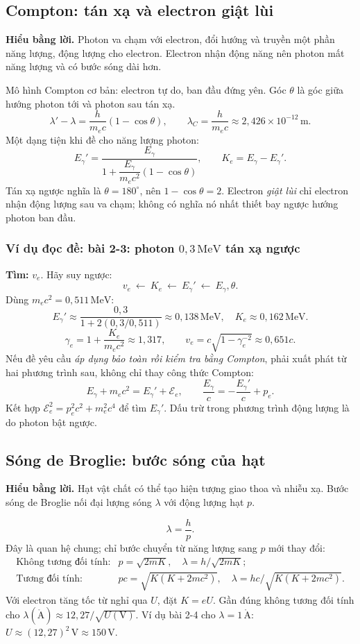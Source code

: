 \documentclass[11pt,a4paper]{article}
\newcommand{\unit}[1]{\,\mathrm{#1}}
\newcommand{\idea}[1]{\par\textbf{Hiểu bằng lời.} #1\par}
\newcommand{\ex}[1]{\subsubsection*{Ví dụ đọc đề: #1}}
\begin{document}
\subsection{Compton: tán xạ và electron giật lùi}\label{sec:compton}
\idea{Photon va chạm với electron, đổi hướng và truyền một phần năng lượng,
động lượng cho electron. Electron nhận động năng nên photon mất năng lượng
và có bước sóng dài hơn.}
Mô hình Compton cơ bản: electron tự do, ban đầu đứng yên.
Góc $\theta$ là góc giữa hướng photon tới và photon sau tán xạ.
\[
\lambda'-\lambda=\frac{h}{m_ec}(1-\cos\theta),\qquad
\lambda_C=\frac h{m_ec}\approx2{,}426\times10^{-12}\unit m.
\]
Một dạng tiện khi đề cho năng lượng photon:
\[
E_\gamma'=\frac{E_\gamma}{1+\dfrac{E_\gamma}{m_ec^2}(1-\cos\theta)},
\qquad K_e=E_\gamma-E_\gamma'.
\]
Tán xạ ngược nghĩa là $\theta=180^\circ$, nên $1-\cos\theta=2$.
Electron \emph{giật lùi} chỉ electron nhận động lượng sau va chạm;
không có nghĩa nó nhất thiết bay ngược hướng photon ban đầu.

\ex{bài 2-3: photon $0{,}3\unit{MeV}$ tán xạ ngược}
\textbf{Tìm:} $v_e$. Hãy suy ngược:
\[
v_e\ \longleftarrow\ K_e\ \longleftarrow\ E_\gamma'
\ \longleftarrow\ E_\gamma,\theta.
\]
Dùng $m_ec^2=0{,}511\unit{MeV}$:
\[
E_\gamma'\approx\frac{0{,}3}{1+2(0{,}3/0{,}511)}
\approx0{,}138\unit{MeV},\quad K_e\approx0{,}162\unit{MeV}.
\]
\[
\gamma_e=1+\frac{K_e}{m_ec^2}\approx1{,}317,
\qquad v_e=c\sqrt{1-\gamma_e^{-2}}\approx0{,}651c.
\]
Nếu đề yêu cầu \emph{áp dụng bảo toàn rồi kiểm tra bằng Compton},
phải xuất phát từ hai phương trình sau, không chỉ thay công thức Compton:
\[
E_\gamma+m_ec^2=E_\gamma'+\mathcal E_e,\qquad
\frac{E_\gamma}{c}=-\frac{E_\gamma'}{c}+p_e.
\]
Kết hợp $\mathcal E_e^2=p_e^2c^2+m_e^2c^4$ để tìm $E_\gamma'$.
Dấu trừ trong phương trình động lượng là do photon bật ngược.

\subsection{Sóng de Broglie: bước sóng của hạt}\label{sec:debroglie}
\idea{Hạt vật chất có thể tạo hiện tượng giao thoa và nhiễu xạ.
Bước sóng de Broglie nối đại lượng sóng $\lambda$ với động lượng hạt $p$.}
\[
\lambda=\frac hp.
\]
Đây là quan hệ chung; chỉ bước chuyển từ năng lượng sang $p$ mới thay đổi:
\[
\begin{array}{ll}
\text{Không tương đối tính:}&p=\sqrt{2mK},\quad \lambda=h/\sqrt{2mK};\\[4pt]
\text{Tương đối tính:}&pc=\sqrt{K(K+2mc^2)},\quad
\lambda=hc/\sqrt{K(K+2mc^2)}.
\end{array}
\]
Với electron tăng tốc từ nghỉ qua $U$, đặt $K=eU$.
Gần đúng không tương đối tính cho
$\lambda(\mathrm{\mathring A})\approx12{,}27/\sqrt{U(\mathrm V)}$.
Ví dụ bài 2-4 cho $\lambda=1\unit{\mathring A}$:
$U\approx(12{,}27)^2\unit V\approx150\unit V$.
\end{document}
